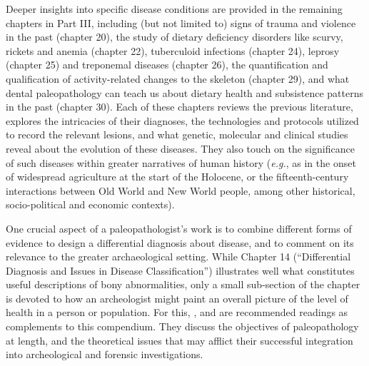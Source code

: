 \documentclass{ijsra}
\begin{document}
Deeper insights into specific disease conditions are provided in the remaining chapters in Part III, including (but not limited to) signs of trauma and violence in the past (chapter 20), the study of dietary deficiency disorders like scurvy, rickets and anemia (chapter 22), tuberculoid infections (chapter 24), leprosy (chapter 25) and treponemal diseases (chapter 26), the quantification and qualification of activity-related changes to the skeleton (chapter 29), and what dental paleopathology can teach us about dietary health and subsistence patterns in the past (chapter 30).
Each of these chapters reviews the previous literature, explores the intricacies of their diagnoses, the technologies and protocols utilized to record the relevant lesions, and what genetic, molecular and clinical studies reveal about the evolution of these diseases.
They also touch on the significance of such diseases within greater narratives of human history (\textit{e.g.}, as in the onset of widespread agriculture at the start of the Holocene, or the fifteenth-century interactions between Old World and New World people, among other historical, socio-political and economic contexts).

One crucial aspect of a paleopathologist’s work is to combine different forms of evidence to design a differential diagnosis about disease, and to comment on its relevance to the greater archaeological setting.
While Chapter 14 (“Differential Diagnosis and Issues in Disease Classification”) illustrates well what constitutes useful descriptions of bony abnormalities, only a small sub-section of the chapter is devoted to how an archeologist might paint an overall picture of the level of health in a person or population.
For this, \textcite{Waldron1994}, \textcite{Robb2000} and \textcites{Ortner2003b}{Ortner2003c}{Ortner2011} are recommended readings as complements to this compendium. They discuss the objectives of paleopathology at length, and the theoretical issues that may afflict their successful integration into archeological and forensic investigations.
\end{document}
